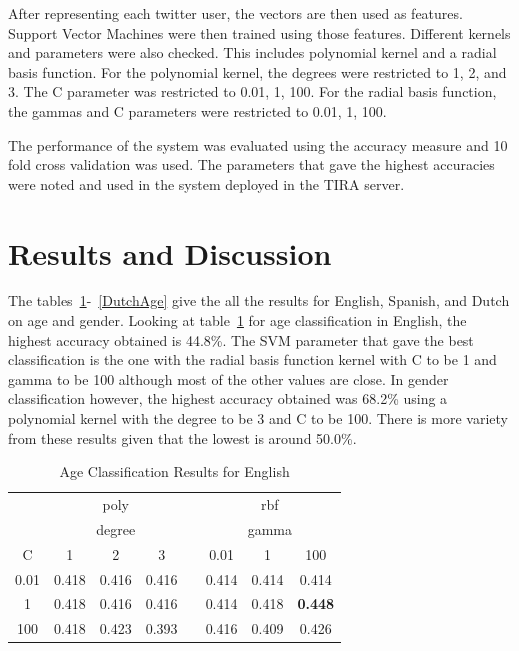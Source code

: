\documentclass[conference]{IEEEtran}
\begin{document}
After representing each twitter user, the vectors are then used as features. Support Vector Machines were then trained using those features. Different kernels and parameters were also checked. This includes polynomial kernel and a radial basis function. For the polynomial kernel, the degrees were restricted to 1, 2, and 3. The C parameter was restricted to 0.01, 1, 100. For the radial basis function, the gammas and C parameters were restricted to 0.01, 1, 100.

The performance of the system was evaluated using the accuracy measure and 10 fold cross validation was used. The parameters that gave the highest accuracies were noted and used in the system deployed in the TIRA server. 

\section{Results and Discussion}
The tables~\ref{EnglishAge}-~\ref{DutchAge} give the all the results for English, Spanish, and Dutch on age and gender. Looking at table~\ref{EnglishAge} for age classification in English, the highest accuracy obtained is 44.8\%. The SVM parameter that gave the best classification is the one with the radial basis function kernel with C to be 1 and gamma to be 100 although most of the other values are close. In gender classification however, the highest accuracy obtained was 68.2\% using a polynomial kernel with the degree to be 3 and C to be 100. There is more variety from these results given that the lowest is around 50.0\%.
\begin{table}[!htbp]
\centering
\caption{Age Classification Results for English}
\label{EnglishAge}
\setlength{\tabcolsep}{0.5em}
{\renewcommand{\arraystretch}{1.2}%
\begin{tabular}{c|ccccccc}
\toprule
     & \multicolumn{3}{c}{poly}   &  & \multicolumn{3}{c}{rbf}        \\
     & \multicolumn{3}{c}{degree} &  & \multicolumn{3}{c}{gamma}      \\
C    & 1       & 2       & 3      &  & 0.01  & 1     & 100            \\
\midrule
0.01 & 0.418   & 0.416   & 0.416  &  & 0.414 & 0.414 & 0.414          \\
1    & 0.418   & 0.416   & 0.416  &  & 0.414 & 0.418 & \textbf{0.448} \\
100  & 0.418   & 0.423   & 0.393  &  & 0.416 & 0.409 & 0.426         \\
\bottomrule 
\end{tabular}
}
\end{table}
\end{document}
